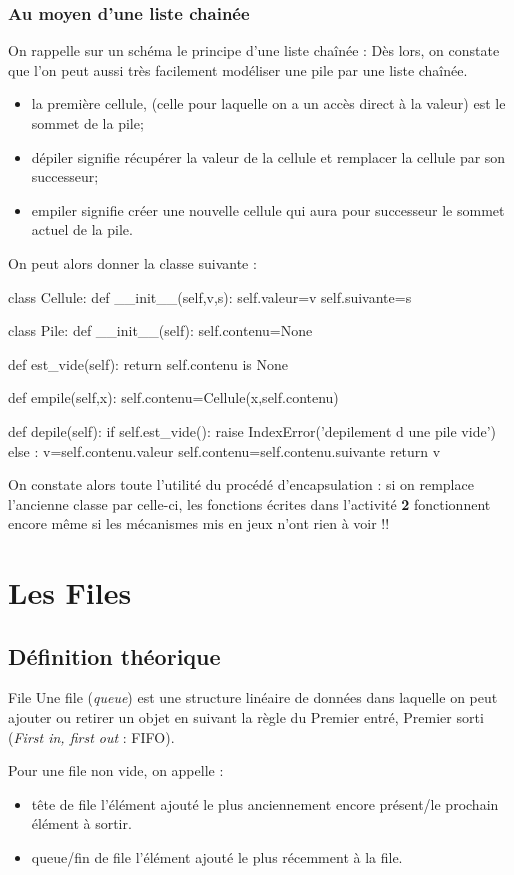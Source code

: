 \documentclass[11pt,a4paper,french,twoside]{PMCours}
\begin{document}
\subsubsection{Au moyen d'une liste chainée}
On rappelle sur un schéma le principe d'une liste chaînée : 
\vfill\noindent
Dès lors, on constate que l'on peut aussi très facilement modéliser une 
pile par une liste chaînée.  
\begin{itemize}
\item la première cellule, (celle pour laquelle on a un accès direct à la valeur)
est le sommet de la pile;
\item dépiler signifie récupérer la valeur de la cellule et remplacer la cellule 
par son successeur;
\item empiler signifie créer une nouvelle cellule qui aura pour successeur le 
sommet actuel de la pile.   
\end{itemize}
On peut alors donner la classe suivante : 
\begin{Python}
class Cellule:
    def __init__(self,v,s):
        self.valeur=v
        self.suivante=s
        
class Pile:
    def __init__(self):
        self.contenu=None
    
    def est_vide(self):
        return self.contenu is None
    
    def empile(self,x):
        self.contenu=Cellule(x,self.contenu)
    
    def depile(self):
        if self.est_vide():
            raise IndexError('depilement d une pile vide')
        else :
            v=self.contenu.valeur
            self.contenu=self.contenu.suivante
            return v
\end{Python}%

On constate alors toute l'utilité du procédé d'encapsulation : si on remplace 
l'ancienne classe  par celle-ci, les fonctions écrites dans l'activité 
{\bf 2} fonctionnent encore même si les mécanismes mis en jeux n'ont rien à voir !! 
\newpage\noindent
\section{Les Files}
\subsection{Définition théorique}
\begin{Definition}{File}
Une file ({\em queue}) est une structure linéaire de données dans laquelle on peut 
ajouter ou retirer un objet en suivant la règle du {\color{red} Premier entré, 
Premier sorti} ({\em First in, first out} : FIFO).

Pour une file non vide, on appelle :
\begin{itemize}
    \item {\color{red} tête de file} l'élément ajouté le plus anciennement encore présent/le 
prochain élément à sortir.
   \item  {\color{red} queue/fin de file} l'élément ajouté le plus récemment à la file.
\end{itemize}
\end{Definition}
\end{document}
